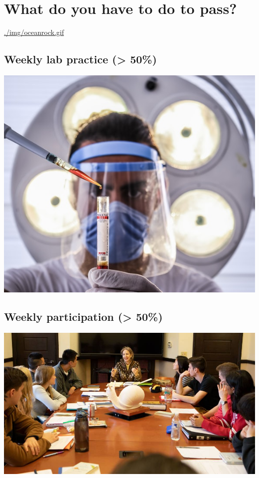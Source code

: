 \documentclass[11pt]{article}
\begin{document}
\section*{What do you have to do to pass?}
\label{sec:org0651bba}

\url{./img/oceanrock.gif}

\subsection*{Weekly lab practice (> 50\%)}
\label{sec:org6e0af14}

\begin{center}
\includegraphics[width=.9\linewidth]{./img/lab.jpeg}
\end{center}

\subsection*{Weekly participation (> 50\%)}
\label{sec:org8730331}

\begin{center}
\includegraphics[width=.9\linewidth]{./img/seminar.jpg}
\end{center}
\end{document}
